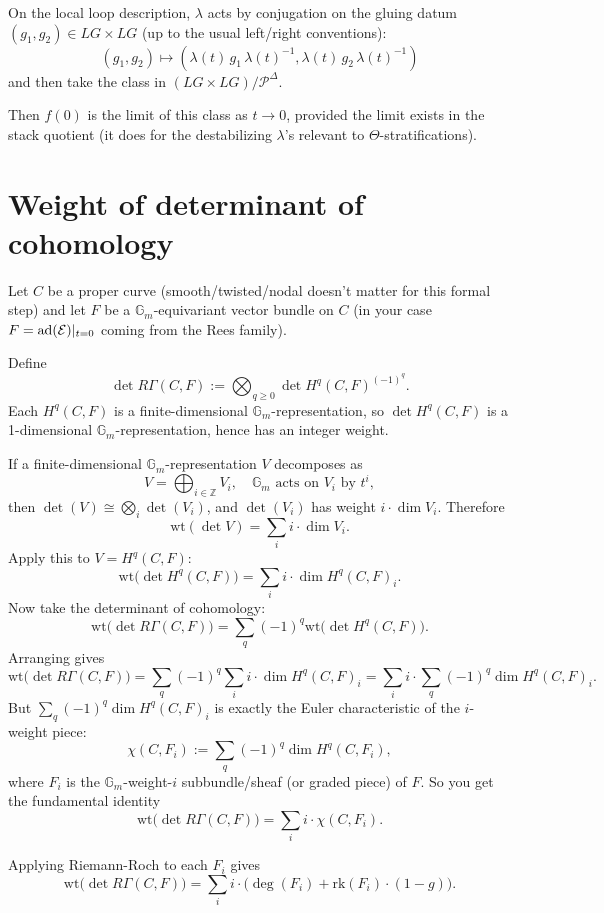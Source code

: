 \documentclass[12pt]{article}
\begin{document}
On the local loop description, $\lambda$ acts by conjugation on the gluing datum $(g_1, g_2) \in LG \times LG$ (up to the usual left/right conventions):
\[
(g_1, g_2) \mapsto (\lambda(t) \, g_1 \, \lambda(t)^{-1}, \lambda(t) \, g_2 \, \lambda(t)^{-1})
\]
and then take the class in $(LG \times LG)/\mathcal{P}^\Delta$.

Then $f(0)$ is the limit of this class as $t \to 0$, provided the limit exists in the stack quotient (it does for the destabilizing $\lambda$'s relevant to $\Theta$-stratifications).

\section{Weight of determinant of cohomology}

Let $C$ be a proper curve (smooth/twisted/nodal doesn't matter for this formal step) and let $F$ be a $\mathbb{G}_m$-equivariant vector bundle on $C$ (in your case $F = \operatorname{ad}(\mathcal{E})|_{t=0}$ coming from the Rees family).

Define
\[
\det R\Gamma(C, F) := \bigotimes_{q \geq 0} \det H^q(C, F)^{(-1)^q}.
\]
Each $H^q(C, F)$ is a finite-dimensional $\mathbb{G}_m$-representation, so $\det H^q(C, F)$ is a 1-dimensional $\mathbb{G}_m$-representation, hence has an integer weight.



If a finite-dimensional $\mathbb{G}_m$-representation $V$ decomposes as
\[
V = \bigoplus_{i \in \mathbb{Z}} V_i, \quad \mathbb{G}_m \text{ acts on } V_i \text{ by } t^i,
\]
then $\det(V) \cong \bigotimes_i \det(V_i)$, and $\det(V_i)$ has weight $i \cdot \dim V_i$. Therefore
\[
\mathrm{wt}(\det V) = \sum_i i \cdot \dim V_i. 
\]
Apply this to $V = H^q(C, F)$:
\[
\mathrm{wt}\bigl(\det H^q(C, F)\bigr) = \sum_i i \cdot \dim H^q(C, F)_i.
\]
Now take the determinant of cohomology:
\[
\mathrm{wt}\bigl(\det R\Gamma(C, F)\bigr) = \sum_q (-1)^q \mathrm{wt}\bigl(\det H^q(C, F)\bigr).
\]
Arranging gives
\[
\mathrm{wt}\bigl(\det R\Gamma(C, F)\bigr) = \sum_q (-1)^q \sum_i i \cdot \dim H^q(C, F)_i = \sum_i i \cdot \sum_q (-1)^q \dim H^q(C, F)_i.
\]
But $\sum_q (-1)^q \dim H^q(C, F)_i$ is exactly the Euler characteristic of the $i$-weight piece:
\[
\chi(C, F_i) := \sum_q (-1)^q \dim H^q(C, F_i),
\]
where $F_i$ is the $\mathbb{G}_m$-weight-$i$ subbundle/sheaf (or graded piece) of $F$. So you get the fundamental identity
\[
\boxed{\mathrm{wt}\bigl(\det R\Gamma(C, F)\bigr) = \sum_i i \cdot \chi(C, F_i)}.
\]

Applying Riemann-Roch to each $F_i$ gives
\[
\mathrm{wt}\bigl(\det R\Gamma(C, F)\bigr) = \sum_i i \cdot \bigl(\deg(F_i) + \mathrm{rk}(F_i) \cdot (1 - g)\bigr).
\]
\end{document}
